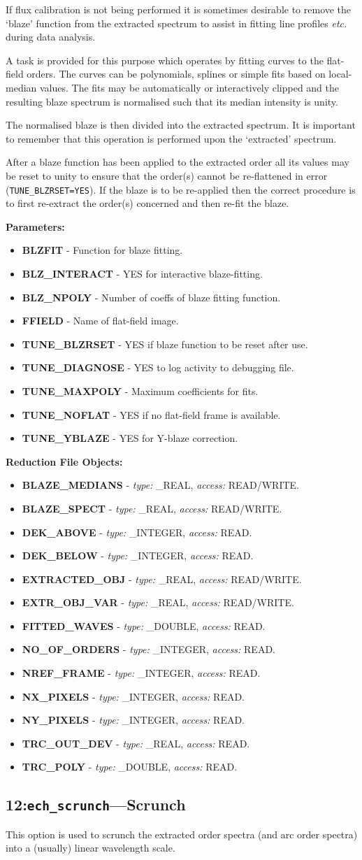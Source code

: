 \documentclass[11pt,twoside]{article}
\makeatletter
\newcommand{\stardocinitials}  {SUN}
\newcommand{\stardocnumber}    {152.4}
\newcommand{\stardocname}{\stardocinitials /\stardocnumber}
\newcommand{\htmlref}[2]{#1}
\newcommand{\xlabel}[1]{}
\newcommand{\myindex}[1]{\index{#1}}
\newcommand{\indexcmdname}[1]{\index{#1@\protect\cmdname{#1}}}
\renewcommand{\myindex}[1]{}
\renewcommand{\indexcmdname}[1]{}
\newcommand{\cmdname}{\begingroup \catcode`\_=12 \realcmdname}
\newcommand{\realcmdname}[1]{\endgroup\texttt{#1}}
\newlength{\sstbannerlength}
\newlength{\sstcaptionlength}
\newcommand{\echtask}[4]{
   \goodbreak
   \rule{\textwidth}{0.5mm}
   \vspace{-7ex}
   \newline
   \settowidth{\sstbannerlength}{{\Large {\bf #3}}}
   \setlength{\sstcaptionlength}{\textwidth}
   \addtolength{\sstbannerlength}{0.5em}
   \addtolength{\sstcaptionlength}{-2.0\sstbannerlength}
   \addtolength{\sstcaptionlength}{-5.0pt}
   \parbox[t]{\sstbannerlength}{\flushleft{\Large {\bf #3}}}
   \parbox[t]{\sstcaptionlength}{\center{\Large #4}}
   \parbox[t]{\sstbannerlength}{\flushright{\Large {\bf #3}}}
   \label{#1}\label{#2}
   \markboth{#3}{\stardocname}
   \uppercase{\myindex{#2@\protect\cmdname{#2}}}
}
\renewcommand{\echtask}[4]
{
  \subsection{\xlabel{#1}\xlabel{#2}\label{#1}\label{#2}#3---#4}
  \markboth{#3}{\stardocname}
}
\newcommand{\echpars}[1]{
{\bf Parameters:\vspace*{6pt}\\}
    #1
}
\renewcommand{\echpars}[1]{
{\bf Parameters:}
\begin{itemize}
#1
\end{itemize}
}
\newcommand{\epar}[3]
{
    \hspace*{5mm}\makebox[50mm][l]{\bf #1} #2 (p~\pageref{par_#3}.)\\
}
\renewcommand{\epar}[3]
{\item \htmlref{{\bf #1}}{par_#3} - #2}
\newcommand{\lepar}[3]
{
    \hspace*{5mm}\makebox[50mm][l]{\bf #1} #2 (p~\pageref{par_#3}.)
}
\renewcommand{\lepar}[3]
{\item \htmlref{{\bf #1}}{par_#3} - #2}
\newcommand{\echredobj}[1]{
{\bf Reduction File Objects:\vspace*{6pt}\\}
      \hspace*{5mm}\makebox[50mm][l]{Object}\makebox[25mm][l]{Type}{Access}\\
      #1
}
\renewcommand{\echredobj}[1]{
{\bf Reduction File Objects:}
\begin{itemize}
#1
\end{itemize}
}
\newcommand{\eobj}[3]
{
    \hspace*{5mm}\makebox[50mm][l]{\bf #1}\makebox[25mm][l]{\tt #2}{\tt #3}\\
}
\renewcommand{\eobj}[3]
{\item {\bf #1} - {\it type:} #2, {\it access:} #3.}
\newcommand{\leobj}[3]
{
    \hspace*{5mm}\makebox[50mm][l]{\bf #1}\makebox[25mm][l]{\tt #2}{\tt #3}
}
\renewcommand{\leobj}[3]
{\item {\bf #1} - {\it type:} #2, {\it access:} #3.}
\makeatother
\begin{document}
If flux calibration is not being performed it is sometimes desirable to
remove the `blaze' function from the extracted spectrum to assist in
fitting line profiles {\it etc.} during data analysis.

A task is provided for this purpose which operates by fitting curves
to the flat-field orders.  The curves can be polynomials, splines or
simple fits based on local-median values.  The fits may be automatically or
interactively clipped and the resulting blaze spectrum is normalised such
that its median intensity is unity.

The normalised blaze is then divided into the extracted spectrum. It is
important to remember that this operation is performed upon the `extracted'
spectrum.

\indexcmdname{TUNE_BLZRSET}
After a blaze function has been applied to the extracted order all its
values may be reset to unity to ensure that the order(s) cannot be
re-flattened in error
(\htmlref{{\tt{TUNE\_BLZRSET=YES}}}{par_TUNE_BLZRSET}).  If the
blaze is to be re-applied then the correct procedure is to first
re-extract the order(s) concerned and then re-fit the blaze.

\echpars{
\epar{BLZFIT}{Function for blaze fitting.}{BLZFIT}
\epar{BLZ\_INTERACT}{YES for interactive blaze-fitting.}{BLZ_INTERACT}
\epar{BLZ\_NPOLY}{Number of coeffs of blaze fitting function.}{BLZ_NPOLY}
\epar{FFIELD}{Name of flat-field image.}{FFIELD}
\epar{TUNE\_BLZRSET}{YES if blaze function to be reset after use.}{TUNE_BLZRSET}
\epar{TUNE\_DIAGNOSE}{YES to log activity to debugging file.}{TUNE_DIAGNOSE}
\epar{TUNE\_MAXPOLY}{Maximum coefficients for fits.}{TUNE_MAXPOLY}
\epar{TUNE\_NOFLAT}{YES if no flat-field frame is available.}{TUNE_NOFLAT}
\lepar{TUNE\_YBLAZE}{YES for Y-blaze correction.}{TUNE_YBLAZE}
}


\echredobj{
\eobj{BLAZE\_MEDIANS}{\_REAL}{READ/WRITE}
\eobj{BLAZE\_SPECT}{\_REAL}{READ/WRITE}
\eobj{DEK\_ABOVE}{\_INTEGER}{READ}
\eobj{DEK\_BELOW}{\_INTEGER}{READ}
\eobj{EXTRACTED\_OBJ}{\_REAL}{READ/WRITE}
\eobj{EXTR\_OBJ\_VAR}{\_REAL}{READ/WRITE}
\eobj{FITTED\_WAVES}{\_DOUBLE}{READ}
\eobj{NO\_OF\_ORDERS}{\_INTEGER}{READ}
\eobj{NREF\_FRAME}{\_INTEGER}{READ}
\eobj{NX\_PIXELS}{\_INTEGER}{READ}
\eobj{NY\_PIXELS}{\_INTEGER}{READ}
\eobj{TRC\_OUT\_DEV}{\_REAL}{READ}
\leobj{TRC\_POLY}{\_DOUBLE}{READ}
}


\echtask{option12}{ech_scrunch}{12:{\tt ech\_scrunch}}{Scrunch}
\myindex{Scrunching}

This option is used to scrunch the extracted order spectra (and arc order
spectra) into a (usually) linear wavelength scale.
\end{document}
